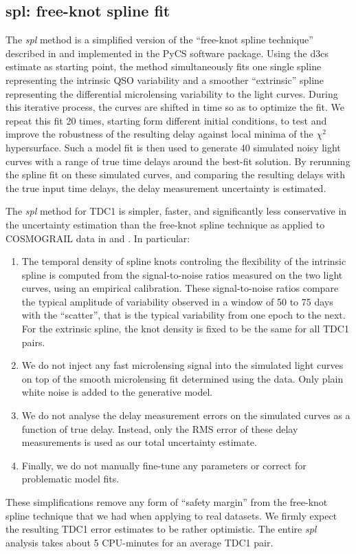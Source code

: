 \documentclass[traditabstract]{aa}
\begin{document}
\subsection{spl: free-knot spline fit}
The \emph{spl} method is a simplified version of the ``free-knot spline technique'' described in \citet{pycs} and implemented in the PyCS software package. Using the d3cs estimate as starting point, the method simultaneously fits one single spline representing the intrinsic QSO variability and a smoother ``extrinsic'' spline representing the differential microlensing variability to the light curves. During this iterative process, the curves are shifted in time so as to optimize the fit. We repeat this fit 20 times, starting form different initial conditions, to test and improve the robustness of the resulting delay against local minima of the $\chi^2$ hypersurface. Such a model fit is then used to generate 40 simulated noisy light curves with a range of true time delays around the best-fit solution. By rerunning the spline fit on these simulated curves, and comparing the resulting delays with the true input time delays, the delay measurement uncertainty is estimated.

The \emph{spl} method for TDC1 is simpler, faster, and significantly less conservative in the uncertainty estimation than the free-knot spline technique as applied to COSMOGRAIL data in \citet{Tewes:2013iz} and \citet{RathnaKumar:2013eu}. In particular:
\begin{enumerate}
\item The temporal density of spline knots controling the flexibility of the intrinsic spline is computed from the signal-to-noise ratios measured on the two light curves, using an empirical calibration. These signal-to-noise ratios compare the typical amplitude of variability observed in a window of 50 to 75 days with the ``scatter'', that is the typical variability from one epoch to the next. For the extrinsic spline, the knot density is fixed to be the same for all TDC1 pairs.
\item We do not inject any fast microlensing signal into the simulated light curves on top of the smooth microlensing fit determined using the data. Only plain white noise is added to the generative model. 
\item We do not analyse the delay measurement errors on the simulated curves as a function of true delay. Instead, only the RMS error of these delay measurements is used as our total uncertainty estimate. 
\item Finally, we do not manually fine-tune any parameters or correct for problematic model fits. 
\end{enumerate}
These simplifications remove any form of ``safety margin'' from the free-knot spline technique that we had when applying to real datasets. We firmly expect the resulting TDC1 error estimates to be rather optimistic. The entire \emph{spl} analysis takes about 5 CPU-minutes for an average TDC1 pair.  
\end{document}
